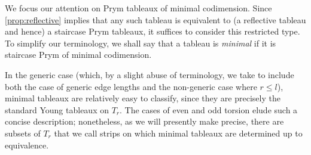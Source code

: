 \documentclass[11pt,reqno]{amsart}
\newcommand{\yoav}[1]{{\color{blue} \sf  Yo$\alpha$v: [#1]}}
\newcommand{\caelan}[1]{\textcolor{orange}{\sf C: [#1]}}
\newcommand{\steven}[1]{\textcolor{pink}{\sf S: [#1]}}
\theoremstyle{definition}
\theoremstyle{problem}
\theoremstyle{plain}
\theoremstyle{remark}
\theoremstyle{theorem}
\numberwithin{equation}{section}
\numberwithin{figure}{section}
\begin{document}

We focus our attention on Prym tableaux of minimal codimension.  Since
\cref{prop:reflective} implies that any such tableau is equivalent to
(a reflective tableau and hence) a staircase Prym tableaux, it
suffices to consider this restricted type.  To simplify our
terminology, we shall say that a tableau is \textit{minimal} if it is
staircase Prym of minimal codimension.

In the generic case (which, by a slight abuse of terminology, we take
to include both the case of generic edge lengths and the non-generic
case where $r \leq l$), minimal tableaux are relatively easy to
classify, since they are precisely the standard Young tableaux on
$T_r$.  The cases of even and odd torsion elude such a concise
description; nonetheless, as we will presently make precise, there are
subsets of $T_r$ that we call strips on which minimal tableaux are
determined up to equivalence.
\end{document}
